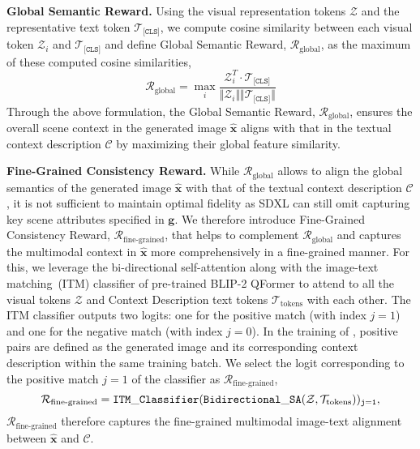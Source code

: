 \textbf{Global Semantic Reward.} Using the visual representation tokens $\mathcal{Z}$ and the representative text token $\mathcal{T}_{\texttt{[CLS]}}$, we compute cosine similarity between each visual token $\mathcal{Z}_i$ and $\mathcal{T}_{\texttt{[CLS]}}$ and define Global Semantic Reward, $\mathcal{R}_\textrm{global}$, as the maximum of these computed cosine similarities,
\begin{equation}
    \mathcal{R}_\textrm{global} =  \max_i \frac{\mathcal{Z}_i^T\cdot\mathcal{T}_{\texttt{[CLS]}}}{\Vert\mathcal{Z}_i\Vert\Vert\mathcal{T}_{\texttt{[CLS]}}\Vert}
\end{equation}
Through the above formulation, the Global Semantic Reward, $\mathcal{R}_\textrm{global}$, ensures the overall scene context in the generated image $\mathbf{\hat{x}}$ aligns with that in the textual context description $\mathcal{C}$ by maximizing their global feature similarity.

\textbf{Fine-Grained Consistency Reward.} While $\mathcal{R}_\textrm{global}$ allows to align the global semantics of the generated image $\mathbf{\hat{x}}$ with that of the textual context description $\mathcal{C}$, it is not sufficient to maintain optimal fidelity as SDXL can still omit capturing key scene attributes specified in $\mathbf{g}$. We therefore introduce Fine-Grained Consistency Reward, $\mathcal{R}_{\textrm{fine-grained}}$, that helps to complement $\mathcal{R}_\textrm{global}$ and captures the multimodal context in $\mathbf{\hat{x}}$ more comprehensively in a fine-grained manner. For this, we leverage the bi-directional self-attention along with the image-text matching~(ITM) classifier of pre-trained BLIP-2 QFormer to attend to all the visual tokens $\mathcal{Z}$ and Context Description text tokens $\mathcal{T}_{\mathrm{tokens}}$ with each other. The ITM classifier outputs two logits: one for the positive match (with index $j=1$) and one for the negative match (with index $j=0$). In the training of \method, positive pairs are defined as the generated image and its corresponding context description within the same training batch. We select the logit corresponding to the positive match $j=1$ of the classifier as $\mathcal{R}_{\textrm{fine-grained}}$,
\begin{equation}
    \mathcal{R}_{\textrm{fine-grained}} = \tt{ITM\_Classifier}(\tt{Bidirectional\_SA}(\mathcal{Z}, \mathcal{T}_{\mathrm{tokens}}))_{j=1},
\end{equation}
$\mathcal{R}_{\textrm{fine-grained}}$ therefore captures the fine-grained multimodal image-text alignment between $\mathbf{\hat{x}}$ and $\mathcal{C}$.

